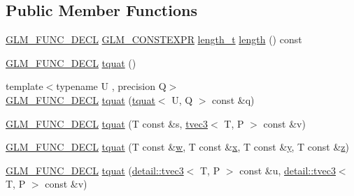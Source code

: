 \subsection*{Public Member Functions}
\begin{DoxyCompactItemize}
\item 
\hyperlink{setup_8hpp_ab2d052de21a70539923e9bcbf6e83a51}{G\+L\+M\+\_\+\+F\+U\+N\+C\+\_\+\+D\+E\+CL} \hyperlink{setup_8hpp_a08b807947b47031d3a511f03f89645ad}{G\+L\+M\+\_\+\+C\+O\+N\+S\+T\+E\+X\+PR} \hyperlink{namespaceglm_a090a0de2260835bee80e71a702492ed9}{length\+\_\+t} \hyperlink{structglm_1_1detail_1_1tquat_a7908057d4c01c84ee62b55b1f188f822}{length} () const
\item 
\hyperlink{setup_8hpp_ab2d052de21a70539923e9bcbf6e83a51}{G\+L\+M\+\_\+\+F\+U\+N\+C\+\_\+\+D\+E\+CL} \hyperlink{structglm_1_1detail_1_1tquat_ad7d05952f6137c055c979eff05e7ef55}{tquat} ()
\item 
{\footnotesize template$<$typename U , precision Q$>$ }\\\hyperlink{setup_8hpp_ab2d052de21a70539923e9bcbf6e83a51}{G\+L\+M\+\_\+\+F\+U\+N\+C\+\_\+\+D\+E\+CL} \hyperlink{structglm_1_1detail_1_1tquat_aa6b415284ed415db4ac328f3c0fd42d7}{tquat} (\hyperlink{structglm_1_1detail_1_1tquat}{tquat}$<$ U, Q $>$ const \&q)
\item 
\hyperlink{setup_8hpp_ab2d052de21a70539923e9bcbf6e83a51}{G\+L\+M\+\_\+\+F\+U\+N\+C\+\_\+\+D\+E\+CL} \hyperlink{structglm_1_1detail_1_1tquat_aba298cc62aaee76c3d19294f33454187}{tquat} (T const \&s, \hyperlink{structglm_1_1detail_1_1tvec3}{tvec3}$<$ T, P $>$ const \&v)
\item 
\hyperlink{setup_8hpp_ab2d052de21a70539923e9bcbf6e83a51}{G\+L\+M\+\_\+\+F\+U\+N\+C\+\_\+\+D\+E\+CL} \hyperlink{structglm_1_1detail_1_1tquat_af383bd6a9c92f94bc8b7ba0be770d4e5}{tquat} (T const \&\hyperlink{structglm_1_1detail_1_1tquat_a83472ee38e4268c15ac92658e1ebfbb0}{w}, T const \&\hyperlink{structglm_1_1detail_1_1tquat_ae4db777c41ba0c7329107a4c7aa1f956}{x}, T const \&\hyperlink{structglm_1_1detail_1_1tquat_a50895e2da4e59255b25271a44ae3e43d}{y}, T const \&\hyperlink{structglm_1_1detail_1_1tquat_a65c2b0af6a4b59327015b766f25416ef}{z})
\item 
\hyperlink{setup_8hpp_ab2d052de21a70539923e9bcbf6e83a51}{G\+L\+M\+\_\+\+F\+U\+N\+C\+\_\+\+D\+E\+CL} \hyperlink{structglm_1_1detail_1_1tquat_a203189580d111eb8a73ed10a1d640464}{tquat} (\hyperlink{structglm_1_1detail_1_1tvec3}{detail\+::tvec3}$<$ T, P $>$ const \&u, \hyperlink{structglm_1_1detail_1_1tvec3}{detail\+::tvec3}$<$ T, P $>$ const \&v)
\item 

\end{DoxyCompactItemize}
